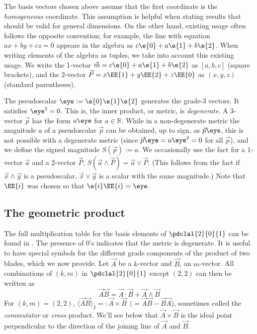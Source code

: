 \documentclass{birkjour}
\newcommand{\fvonly}[1]{\ifthenelse{\equal{\isFV}{true}}{#1}{}}
\begin{document}
The basis vectors chosen above assume that the first coordinate is the \emph{homogeneous} coordinate. This assumption is helpful when stating results that should be valid for general dimensions.  On the other hand, existing usage often follows the opposite convention; for example, the line with equation $ax + by + cz = 0$ appears in the algebra as $c\e{0} + a\e{1} + b\e{2}$.  When writing elements of the algebra as tuples, we take into account this existing usage.  We write the 1-vector $\vec{m} = c\e{0} + a\e{1} + b\e{2} $ as $[a,b,c]$ (square brackets), and the 2-vector $\vec{P} = x\EE{1} + y\EE{2} + z\EE{0}$ as $(x,y,z)$ (standard parentheses).

 The pseudoscalar $\eye := \e{0}\e{1}\e{2}$ generates the grade-3 vectors.  It satisfies $\eye^{2} = 0$.  This is, the inner product, or metric, is \emph{degenerate}. %
 A 3-vector $\vec{p}$ has the form $a\eye$ for $a \in \mathbb{R}$. While in a non-degenerate metric the magnitude $a$ of a pseudoscalar $\vec{p}$ can be obtained, up to sign,  as $\vec{p}\eye$, this is not possible with a degenerate metric (since $\vec{p}\eye = a \eye^2 = 0$ for all $\vec{p}$), and we define the signed magnitude $S(\vec{p}) := a$.  We occasionally use the fact for a 1-vector $\vec{a}$ and a 2-vector $\vec{P}$, $S(\vec{a} \wedge \vec{P}) = \vec{a} \vee \vec{P}$.  (This follows from the fact if $\vec{x}\wedge\vec{y}$ is a pseudoscalar, $\vec{x}\vee\vec{y}$ is a scalar with the same magnitude.) Note that  $\EE{i}$ was chosen so that $\e{i}\EE{i}=\eye$. 

\subsection{The geometric product}
The full multiplication table for the basis elements of $\pdclal{2}{0}{1}$  can be found in .  The presence of 0's indicates that the metric is degenerate.
It is useful to have special symbols for the different grade components of the product of two blades, which we now provide.
Let $\vec{A}$ be a $k$-vector and $\vec{B}$, an $m$-vector.  All combinations of $(k,m)$ in $\pdclal{2}{0}{1}$ except $(2,2)$ can then be written as 
\[ \vec{A} \vec{B} = \vec{A}\cdot \vec{B} + \vec{A} \wedge \vec{B} \]
For $(k,m) = (2,2)$,  $\langle \vec{A} \vec{B} \rangle_{2} =: \vec{A} \times \vec{B} ~~(= \vec{A}\vec{B} - \vec{B}\vec{A}$), sometimes called the \emph{commutator} or \emph{cross}  product.  We'll see below that $ \vec{A} \times \vec{B} $ is the ideal point perpendicular to the direction of the joining line of $\vec{A}$ and $\vec{B}$. 
\end{document}
